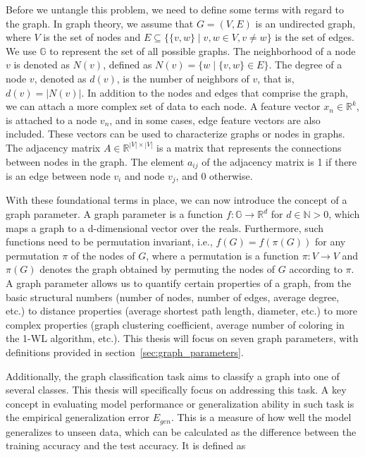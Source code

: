 \documentclass{article}
\begin{document}
Before we untangle this problem, we need to define some terms with regard to the graph. In graph theory, we assume that $G=(V,E)$ is an undirected graph, where $V$ is the set of nodes and $E  \subseteq \{\{v,w\}\mid v,w \in V , v \neq w\}$ is the set of edges. We use $\mathbb{G}$ to represent the set of all possible graphs. The neighborhood of a node $v$ is denoted as $N(v)$, defined as $N(v) = \{w \mid \{v,w\} \in E\}$. The degree of a node $v$, denoted as $d(v)$, is the number of neighbors of $v$, that is, $d(v) = |N(v)|$. In addition to the nodes and edges that comprise the graph, we can attach a more complex set of data to each node.  A feature vector $x_n\in \mathbb{R}^k$, is attached to a node $v_n$, and in some cases, edge feature vectors are also included. These vectors can be used to characterize graphs or nodes in graphs. The adjacency matrix $A \in \mathbb{R}^{|V| \times |V|}$ is a matrix that represents the connections between nodes in the graph. The element $a_{ij}$ of the adjacency matrix is 1 if there is an edge between node $v_i$ and node $v_j$, and 0 otherwise.

With these foundational terms in place, we can now introduce the concept of a graph parameter. A graph parameter is a function $f: \mathbb{G} \rightarrow \mathbb{R}^d$ for $d\in \mathbb{N} >0$, which maps a graph to a d-dimensional vector over the reals. Furthermore, such functions need to be permutation invariant, i.e., $f(G) = f(\pi(G))$ for any permutation $\pi$ of the nodes of $G$, where a permutation is a function $\pi: V \rightarrow V$ and $\pi(G)$ denotes the graph obtained by permuting the nodes of $G$ according to $\pi$. A graph parameter allows us to quantify certain properties of a graph, from the basic structural numbers (number of nodes, number of edges, average degree, etc.) to distance properties (average shortest path length, diameter, etc.) to more complex properties (graph clustering coefficient, average number of coloring in the 1-WL algorithm, etc.). This thesis will focus on seven graph parameters, with definitions provided in section~\ref{sec:graph_parameters}.

Additionally, the graph classification task aims to classify a graph into one of several classes. This thesis will specifically focus on addressing this task. A key concept in evaluating model performance or generalization ability in such task is the empirical generalization error $E_{gen}$. This is a measure of how well the model generalizes to unseen data, which can be calculated as the difference between the training accuracy and the test accuracy. It is defined as
\end{document}
